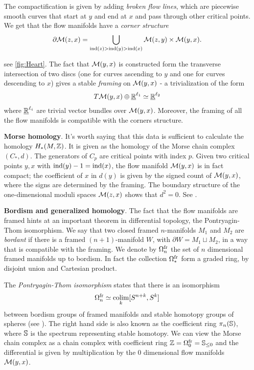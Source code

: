 The compactification is given by adding \emph{broken flow lines}, which are piecewise smooth curves that start at $y$ and end at $x$ and pass through other critical points. We get that the flow manifolds have a \emph{corner structure}
\begin{equation*}
    \partial \mathcal{M}(z,x) = \bigcup_{\operatorname{ind}(z) > \operatorname{ind}(y) > \operatorname{ind}(x)} \mathcal{M}(z,y) \times \mathcal{M}(y,x).
\end{equation*}

see \cref{fig:Heart}. The fact that $\mathcal{M}(y,x)$ is constructed form the transverse intersection of two discs (one for curves ascending to $y$ and one for curves descending to $x$) gives a stable \emph{framing} on $\mathcal{M}(y,x)$ - a trivialization of the form 
\begin{equation*}
    T\mathcal{M}(y,x) \oplus \underline{\mathbb{R}}^{\ell_1} \overset{}{\simeq} \underline{\mathbb{R}}^{\ell_2}
\end{equation*}
where $\underline{\mathbb{R}}^{\ell_i}$ are trivial vector bundles over $\mathcal{M}(y,x)$. Moreover, the framing of all the flow manifolds is compatible with the corners structure.

\textbf{Morse homology}. It's worth saying that this data is sufficient to calculate the homology $H_*(M,\mathbb{Z})$. It is given as the homology of the Morse chain complex $(C_*, d)$. The generators of $C_p$ are critical points with index $p$. Given two critical points $y,x$ with $\operatorname{ind}(y) -1 = \operatorname{ind}(x)$, the flow manifold $\mathcal{M}(y,x)$ is in fact compact; the coefficient of $x$ in $d(y)$ is given by the signed count of $\mathcal{M}(y,x)$, where the signs are determined by the framing. The boundary structure of the one-dimensional moduli spaces $\mathcal{M}(z, x)$ shows that $d^2 = 0$. See \cite{schwarz1993morse}.

\textbf{Bordism and generalized homology}. The fact that the flow manifolds are framed hints at an important theorem in differential topology, the Pontryagin-Thom isomorphism. We say that two closed framed $n$-manifolds $M_1$ and $M_2$ are \emph{bordant} if there is a framed $(n+1)$-manifold $W$, with $\partial W = M_1 \sqcup M_2$, in a way that is compatible with the framing. We denote by $\Omega^{\operatorname{fr}}_n$ the set of $n$ dimensional framed manifolds up to bordism. In fact the collection $\Omega_*^{\operatorname{fr}}$ form a graded ring, by disjoint union and Cartesian product.

The \emph{Pontryagin-Thom isomorphism} states that there is an isomorphism
\begin{equation*}
    \Omega_n^{\operatorname{fr}} \simeq \operatorname*{colim}_k [S^{n+k},S^k]
\end{equation*}
between bordism groups of framed manifolds and stable homotopy groups of spheres (see \cite{pontryagin1955smooth, thom1954quelques}). The right hand side is also known as the coefficient ring $\pi_n(\mathbb{S})$, where $\mathbb{S}$ is the spectrum representing stable homotopy.
We can view the Morse chain complex as a chain complex with coefficient ring $\mathbb{Z} = \Omega_0^{\operatorname{fr}} = \mathbb{S}_{\leq 0}$ and the differential is given by multiplication by the 0 dimensional flow manifolds $\mathcal{M}(y,x)$.

